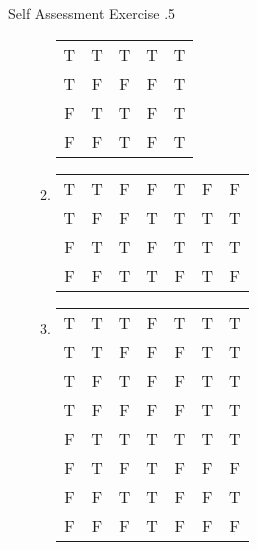 \documentclass[\main/notes.tex]{subfiles}
\begin{document}
\begin{exercise}{Self Assessment Exercise \thechapter.5}
\begin{enumerate}
\begin{enumerate}
\begin{center}
\begin{tabular}{| c c | c | c | c |}
										\hline
										T & T & T & T & T\\
										T & F & F & F & T\\
										F & T & T & F & T\\
										F & F & T & F & T\\
										\hline
									\end{tabular}
								\end{center}
							\item {}
								\begin{center}
									\begin{tabular}{|c c | c c | c | c | c |}
										\hline
										\tablehead{$p$} & \tablehead{$q$} & \tablehead{$\lnot p$} & \tablehead{$\lnot q$} & \tablehead{$p \lor q$} & \tablehead{$\lnot p \lor \lnot q$} & \tablehead{$(p \lor q) \land (\lnot p \lor \lnot q)$}\\
										\hline
										T & T & F & F & T & F & F\\
										T & F & F & T & T & T & T\\
										F & T & T & F & T & T & T\\
										F & F & T & T & F & T & F\\
										\hline
									\end{tabular}
								\end{center}
							\pagebreak
							\item \question{$\bigl(\lnot p \rightarrow [q \land r]\bigr) \lor r$}
								\begin{center}
									\begin{tabular}{|c c c | c | c | c | c|}
										\hline
										\tablehead{$p$} & \tablehead{$q$} & \tablehead{$r$} & \tablehead{$\lnot p$} & \tablehead{$q \land r$} & \tablehead{$\lnot p \rightarrow (q \land r)$} & \tablehead{$[\lnot p \rightarrow (q \land r)] \lor r$}\\
										\hline
										T & T & T & F & T & T & T\\
										T & T & F & F & F & T & T\\
										T & F & T & F & F & T & T\\
										T & F & F & F & F & T & T\\
										F & T & T & T & T & T & T\\
										F & T & F & T & F & F & F\\
										F & F & T & T & F & F & T\\
										F & F & F & T & F & F & F\\

\end{tabular}
\end{center}
\end{enumerate}
\end{enumerate}
\end{exercise}
\end{document}
